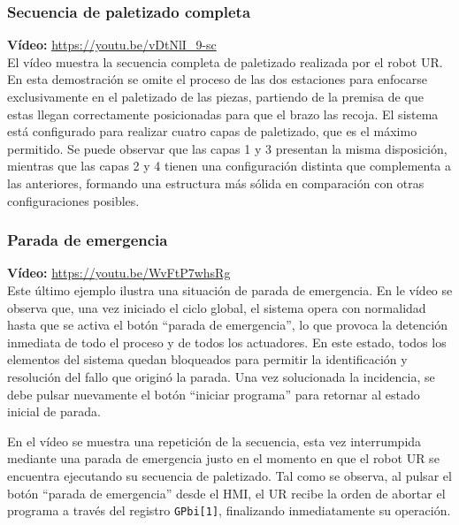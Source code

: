 \clearpage

\subsubsection{Secuencia de paletizado completa}

\textbf{Vídeo:} \url{https://youtu.be/vDtNlI_9-sc} \\

El vídeo muestra la secuencia completa de paletizado realizada por el robot UR. En esta demostración se omite el proceso de las dos estaciones para enfocarse exclusivamente en el paletizado de las piezas, partiendo de la premisa de que estas llegan correctamente posicionadas para que el brazo las recoja. El sistema está configurado para realizar cuatro capas de paletizado, que es el máximo permitido. Se puede observar que las capas 1 y 3 presentan la misma disposición, mientras que las capas 2 y 4 tienen una configuración distinta que complementa a las anteriores, formando una estructura más sólida en comparación con otras configuraciones posibles. \\

\subsubsection{Parada de emergencia}

\textbf{Vídeo:} \url{https://youtu.be/WvFtP7whsRg} \\

Este último ejemplo ilustra una situación de parada de emergencia. En le vídeo se observa que, una vez iniciado el ciclo global, el sistema opera con normalidad hasta que se activa el botón “parada de emergencia”, lo que provoca la detención inmediata de todo el proceso y de todos los actuadores. En este estado, todos los elementos del sistema quedan bloqueados para permitir la identificación y resolución del fallo que originó la parada. Una vez solucionada la incidencia, se debe pulsar nuevamente el botón “iniciar programa” para retornar al estado inicial de parada.

En el vídeo se muestra una repetición de la secuencia, esta vez interrumpida mediante una parada de emergencia justo en el momento en que el robot UR se encuentra ejecutando su secuencia de paletizado. Tal como se observa, al pulsar el botón “parada de emergencia” desde el HMI, el UR recibe la orden de abortar el programa a través del registro \texttt{GPbi[1]}, finalizando inmediatamente su operación.


